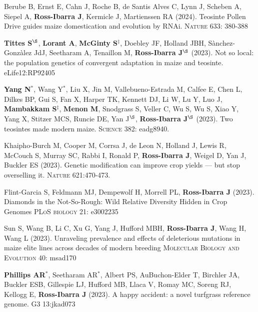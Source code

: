 \documentclass[letterpaper,10pt]{article}
\begin{document}
\begin{etaremune}
\item Berube B, Ernst E, Cahn J, Roche B, de Santis Alves C, Lynn J, Scheben A, Siepel A, \textbf{Ross-Ibarra J}, Kermicle J, Martienssen RA (2024). Teosinte Pollen Drive guides maize domestication and evolution by RNAi. \textsc{Nature} 633: 380-388 

\item \textbf{Tittes S}$^\S$, \textbf{Lorant A}, \textbf{McGinty S}$^\ddagger$, Doebley JF,  Holland JBH, S\`{a}nchez-Gonz\`{a}lez JdJ, Seetharam A, Tenaillon M, \textbf{Ross-Ibarra J}$^\S$ (2023). Not so local: the population genetics of convergent adaptation in maize and teosinte. eLife12:RP92405 %

\item \textbf{Yang N}$^*$, Wang Y$^*$,  Liu X, Jin M, Vallebueno-Estrada M, Calfee E, Chen L, Dilkes BP, Gui S, Fan X, Harper TK, Kennett DJ, Li W, Lu Y, Luo J, \textbf{Mambakkam S}$^\ddagger$, \textbf{Menon M}, Snodgrass S, Veller C, Wu S, Wu S, Xiao Y, Yang X, Stitzer MCS, Runcie DE, Yan J$^\S$, \textbf{Ross-Ibarra J}$^\S$ (2023). Two teosintes made modern maize. \textsc{Science} 382: eadg8940.

\item Khaipho-Burch M, Cooper M, Corrsa J, de Leon N, Holland J, Lewis R, McCouch S, Murray SC, Rabbi I, Ronald P, \textbf{Ross-Ibarra J}, Weigel D, Yan J, Buckler ES (2023). Genetic modification can improve crop yields --- but stop overselling it. \textsc{Nature} 621:470-473.

\item Flint-Garcia S,  Feldmann MJ, Dempewolf H,  Morrell PL, \textbf{Ross-Ibarra J} (2023). Diamonds in the Not-So-Rough: Wild Relative Diversity Hidden in Crop Genomes \textsc{PLoS biology} 21: e3002235	

\item Sun S, Wang B, Li C, Xu G, Yang J, Hufford MBH, \textbf{Ross-Ibarra J}, Wang H, Wang L (2023). Unraveling prevalence and effects of deleterious mutations in maize elite lines across decades of modern breeding \textsc{Molecular Biology and Evolution} 40: msad170

\item \textbf{Phillips AR}$^*$, Seetharam AR$^*$, Albert PS, AuBuchon-Elder T, Birchler JA, Buckler ESB,    Gillespie LJ, Hufford MB,    Llaca V,  Romay MC,  Soreng RJ, Kellogg E, \textbf{Ross-Ibarra J} (2023). A happy accident: a novel turfgrass reference genome. \textsc{G3} 13:jkad073


\end{etaremune}
\end{document}
